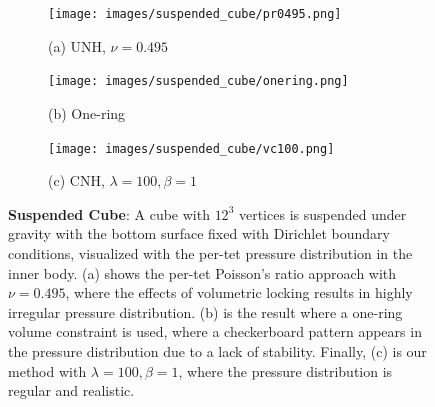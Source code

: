 \begin{figure}
	\centering
	\begin{subfigure}{.32\linewidth}
		\centering
		{\texttt{[image: images/suspended\_cube/pr0495.png]}}
		\caption*{(a) UNH, $\nu = 0.495$}
		\label{sfig:suspended-cube-pr-0495}
	\end{subfigure}%
	\begin{subfigure}{.32\linewidth}
		\centering
		{\texttt{[image: images/suspended\_cube/onering.png]}}
		\caption*{(b) One-ring}
		\label{sfig:suspended-cube-onering}
	\end{subfigure}%
	\begin{subfigure}{.32\linewidth}
		\centering
		{\texttt{[image: images/suspended\_cube/vc100.png]}}
		\caption*{(c) CNH, $\lambda = 100, \beta = 1$}
		\label{sfig:suspended-cube-vc-100}
	\end{subfigure}%
	\caption{\textbf{Suspended Cube}: A cube with $12^3$ vertices is suspended under gravity with the bottom surface fixed with Dirichlet boundary conditions, visualized with the per-tet pressure distribution in the inner body. (a) shows the per-tet Poisson's ratio approach with $\nu = 0.495$, where the effects of volumetric locking results in highly irregular pressure distribution. (b) is the result where a one-ring volume constraint is used, where a checkerboard pattern appears in the pressure distribution due to a lack of stability. Finally, (c) is our method with $\lambda = 100, \beta = 1$, where the pressure distribution is regular and realistic. }
	\label{fig:suspended-cubes}
\end{figure}


